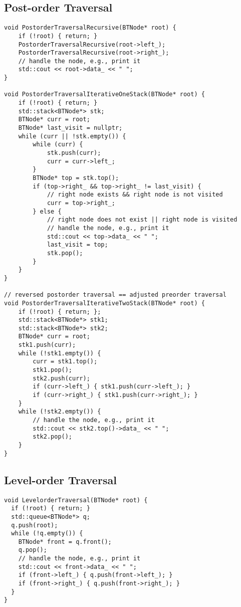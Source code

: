\subsection{Post-order Traversal}
\begin{lstlisting}
void PostorderTraversalRecursive(BTNode* root) {
	if (!root) { return; }
	PostorderTraversalRecursive(root->left_);
	PostorderTraversalRecursive(root->right_);
	// handle the node, e.g., print it
	std::cout << root->data_ << " ";
}

void PostorderTraversalIterativeOneStack(BTNode* root) {
	if (!root) { return; }
	std::stack<BTNode*> stk;
	BTNode* curr = root;
	BTNode* last_visit = nullptr;
	while (curr || !stk.empty()) {
		while (curr) {
			stk.push(curr);
			curr = curr->left_;
		}
		BTNode* top = stk.top();
		if (top->right_ && top->right_ != last_visit) {
			// right node exists && right node is not visited
			curr = top->right_;
		} else {
			// right node does not exist || right node is visited
			// handle the node, e.g., print it
			std::cout << top->data_ << " ";
			last_visit = top;
			stk.pop();
		}
	}
}

// reversed postorder traversal == adjusted preorder traversal
void PostorderTraversalIterativeTwoStack(BTNode* root) {
	if (!root) { return; };
	std::stack<BTNode*> stk1;
	std::stack<BTNode*> stk2;
	BTNode* curr = root;
	stk1.push(curr);
	while (!stk1.empty()) {
		curr = stk1.top();
		stk1.pop();
		stk2.push(curr);
		if (curr->left_) { stk1.push(curr->left_); }
		if (curr->right_) { stk1.push(curr->right_); }
	}
	while (!stk2.empty()) {
		// handle the node, e.g., print it
		std::cout << stk2.top()->data_ << " ";
		stk2.pop();
	}
}
\end{lstlisting}

\subsection{Level-order Traversal}
\begin{lstlisting}
void LevelorderTraversal(BTNode* root) {
  if (!root) { return; }
  std::queue<BTNode*> q;
  q.push(root);
  while (!q.empty()) {
    BTNode* front = q.front();
    q.pop();
    // handle the node, e.g., print it
    std::cout << front->data_ << " ";
    if (front->left_) { q.push(front->left_); }
    if (front->right_) { q.push(front->right_); }
  }
}
\end{lstlisting}